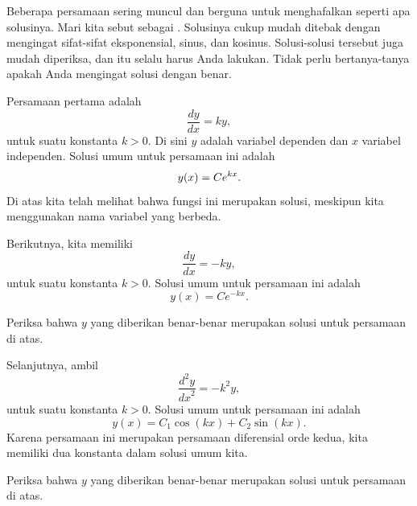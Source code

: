 Beberapa persamaan sering muncul dan
berguna untuk menghafalkan seperti apa
solusinya.
Mari kita sebut sebagai .
Solusinya cukup mudah
ditebak dengan mengingat sifat-sifat eksponensial, sinus, dan kosinus.
Solusi-solusi tersebut juga mudah diperiksa, dan itu selalu harus Anda lakukan.
Tidak perlu bertanya-tanya apakah Anda mengingat solusi dengan benar.

\medskip

Persamaan pertama adalah
\begin{equation*}
\frac{dy}{dx} = k y ,
\end{equation*}
untuk suatu konstanta $k > 0$.
Di sini $y$ adalah variabel dependen dan $x$ variabel independen.
Solusi umum untuk persamaan ini adalah
\begin{equation*}
y(x) = C e^{kx} .
\avoidbreak
\end{equation*}
Di atas kita telah melihat bahwa fungsi ini merupakan solusi, meskipun kita menggunakan
nama variabel yang berbeda.

\medskip

Berikutnya, kita memiliki
\begin{equation*}
\frac{dy}{dx} = -k y ,
\end{equation*}
untuk suatu konstanta $k > 0$.
Solusi umum untuk persamaan ini adalah
\begin{equation*}
y(x) = C e^{-kx} .
\end{equation*}

\begin{exercise}
Periksa bahwa $y$ yang diberikan benar-benar merupakan solusi untuk persamaan di atas.
\end{exercise}

Selanjutnya, ambil
\emph{}
\begin{equation*}
\frac{d^2y}{{dx}^2} = -k^2 y ,
\end{equation*}
untuk suatu konstanta $k > 0$.
Solusi umum untuk persamaan ini adalah
\begin{equation*}
y(x) = C_1 \cos(kx) + C_2 \sin(kx) .
\end{equation*}
Karena persamaan ini merupakan persamaan diferensial orde kedua,
kita memiliki dua konstanta dalam solusi umum kita.

\begin{exercise}
Periksa bahwa $y$ yang diberikan benar-benar merupakan solusi untuk persamaan di atas.
\end{exercise}

